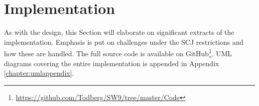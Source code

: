 \section{Implementation}
As with the design, this Section will elaborate on significant extracts of the implementation. Emphasis is put on challenges under the SCJ restrictions and how these are handled. The full source code is available on GitHub\footnote{\url{https://github.com/Todberg/SW9/tree/master/Code}}. UML diagrams covering the entire implementation is appended in Appendix \ref{chapter:umlappendix}.